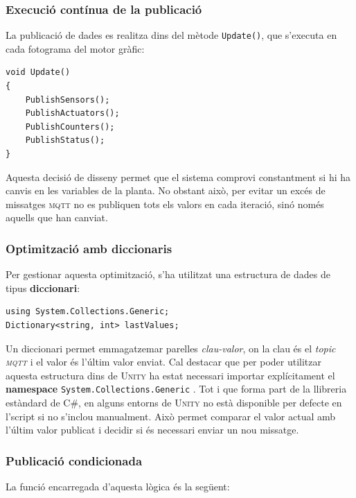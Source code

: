 \documentclass[a4paper,11pt,DIV=13,headings=normal,abstract=true,twoside=semi]{article}
\newcommand{\acro}[1]{\textsc{#1}}
\begin{document}
\subsubsection*{Execució contínua de la publicació}

La publicació de dades es realitza dins del mètode \texttt{Update()}, que s'executa en cada fotograma del motor gràfic:

\begin{lstlisting}[style=simple]
void Update()
{
    PublishSensors();
    PublishActuators();
    PublishCounters();
    PublishStatus();
}
\end{lstlisting}

Aquesta decisió de disseny permet que el sistema comprovi constantment si hi ha canvis en les variables de la planta. No obstant això, per evitar un excés de missatges \acro{mqtt}  no es publiquen tots els valors en cada iteració, sinó només aquells que han canviat.

\subsubsection*{Optimització amb diccionaris}

Per gestionar aquesta optimització, s'ha utilitzat una estructura de dades de tipus \textbf{diccionari}:

\begin{lstlisting}[style=simple]
using System.Collections.Generic;
Dictionary<string, int> lastValues;
\end{lstlisting}

Un diccionari permet emmagatzemar parelles \emph{clau-valor}, on la clau és el \emph{topic \acro{mqtt}}  i el valor és l'últim valor enviat. Cal destacar que per poder utilitzar aquesta estructura dins de \acro{Unity} ha estat necessari importar explícitament el \textbf{namespace} \texttt{System.Collections.Generic} \cite{dotnet_collections}. Tot i que forma part de la llibreria estàndard de C\#, en alguns entorns de \acro{Unity} no està disponible per defecte en l'script si no s'inclou manualment. Això permet comparar el valor actual amb l'últim valor publicat i decidir si és necessari enviar un nou missatge.

\subsubsection*{Publicació condicionada}

La funció encarregada d'aquesta lògica és la següent:
\end{document}
